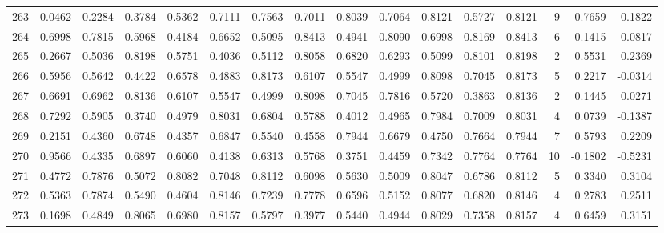\begin{tabular}{lrrrrrrrrrrrrrrr}
263 &      0.0462 &  0.2284 &  0.3784 &  0.5362 &  0.7111 &  0.7563 &  0.7011 &  0.8039 &  0.7064 &  0.8121 &   0.5727 &     0.8121 &      9 &                    0.7659 &                     0.1822 \\
264 &      0.6998 &  0.7815 &  0.5968 &  0.4184 &  0.6652 &  0.5095 &  0.8413 &  0.4941 &  0.8090 &  0.6998 &   0.8169 &     0.8413 &      6 &                    0.1415 &                     0.0817 \\
265 &      0.2667 &  0.5036 &  0.8198 &  0.5751 &  0.4036 &  0.5112 &  0.8058 &  0.6820 &  0.6293 &  0.5099 &   0.8101 &     0.8198 &      2 &                    0.5531 &                     0.2369 \\
266 &      0.5956 &  0.5642 &  0.4422 &  0.6578 &  0.4883 &  0.8173 &  0.6107 &  0.5547 &  0.4999 &  0.8098 &   0.7045 &     0.8173 &      5 &                    0.2217 &                    -0.0314 \\
267 &      0.6691 &  0.6962 &  0.8136 &  0.6107 &  0.5547 &  0.4999 &  0.8098 &  0.7045 &  0.7816 &  0.5720 &   0.3863 &     0.8136 &      2 &                    0.1445 &                     0.0271 \\
268 &      0.7292 &  0.5905 &  0.3740 &  0.4979 &  0.8031 &  0.6804 &  0.5788 &  0.4012 &  0.4965 &  0.7984 &   0.7009 &     0.8031 &      4 &                    0.0739 &                    -0.1387 \\
269 &      0.2151 &  0.4360 &  0.6748 &  0.4357 &  0.6847 &  0.5540 &  0.4558 &  0.7944 &  0.6679 &  0.4750 &   0.7664 &     0.7944 &      7 &                    0.5793 &                     0.2209 \\
270 &      0.9566 &  0.4335 &  0.6897 &  0.6060 &  0.4138 &  0.6313 &  0.5768 &  0.3751 &  0.4459 &  0.7342 &   0.7764 &     0.7764 &     10 &                   -0.1802 &                    -0.5231 \\
271 &      0.4772 &  0.7876 &  0.5072 &  0.8082 &  0.7048 &  0.8112 &  0.6098 &  0.5630 &  0.5009 &  0.8047 &   0.6786 &     0.8112 &      5 &                    0.3340 &                     0.3104 \\
272 &      0.5363 &  0.7874 &  0.5490 &  0.4604 &  0.8146 &  0.7239 &  0.7778 &  0.6596 &  0.5152 &  0.8077 &   0.6820 &     0.8146 &      4 &                    0.2783 &                     0.2511 \\
273 &      0.1698 &  0.4849 &  0.8065 &  0.6980 &  0.8157 &  0.5797 &  0.3977 &  0.5440 &  0.4944 &  0.8029 &   0.7358 &     0.8157 &      4 &                    0.6459 &                     0.3151 \\

\end{tabular}
